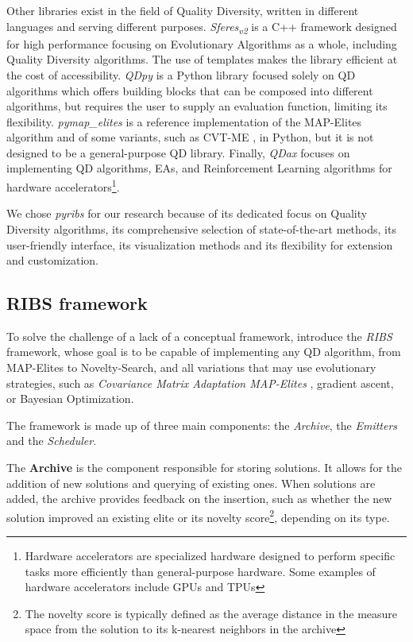 Other libraries exist in the field of Quality Diversity, written in different languages and serving different purposes. \textit{Sferes\textsubscript{v2}} \cite{mouret_sferesv2_2010} is a C++ framework designed for high performance focusing on Evolutionary Algorithms as a whole, including Quality Diversity algorithms. The use of templates makes the library efficient at the cost of accessibility. 
\textit{QDpy} \cite{cazenille_qdpy_2018} is a Python library focused solely on QD algorithms which offers building blocks that can be composed into different algorithms, but requires the user to supply an evaluation function, limiting its flexibility. 
\textit{pymap\_elites} \cite{mouret_python3_2019}  is a reference implementation of the MAP-Elites algorithm and of some variants, such as CVT-ME \cite{vassiliades_using_2017}, in Python, but it is not designed to be a general-purpose QD library.
Finally, \textit{QDax} \cite{lim_accelerated_2022} focuses on implementing QD algorithms, EAs, and Reinforcement Learning algorithms for hardware accelerators\footnote{Hardware accelerators are specialized hardware designed to perform specific tasks more efficiently than general-purpose hardware. Some examples of hardware accelerators include GPUs and TPUs}.

We chose \textit{pyribs} for our research because of its dedicated focus on Quality Diversity algorithms, its comprehensive selection of state-of-the-art methods, its user-friendly interface, its visualization methods and its flexibility for extension and customization. 

\subsection{RIBS framework}
\label{sec:ribs}

To solve the challenge of a lack of a conceptual framework, \citeauthor{tjanaka_pyribs_2023} introduce the \textit{RIBS} framework, whose goal is to be capable of implementing any QD algorithm, from MAP-Elites to Novelty-Search, and all variations that may use evolutionary strategies, such as  \textit{Covariance Matrix Adaptation MAP-Elites} \cite{fontaine_covariance_2020}, gradient ascent, or Bayesian Optimization.

The framework is made up of three main components: the \textit{Archive}, the \textit{Emitters} and the \textit{Scheduler}.

The \textbf{Archive} is the component responsible for storing solutions. It allows for the addition of new solutions and querying of existing ones. When solutions are added, the archive provides feedback on the insertion, such as whether the new solution improved an existing elite or its novelty score\footnote{The novelty score is typically defined as the average distance in the measure space from the solution to its k-nearest neighbors in the archive}, depending on its type.

